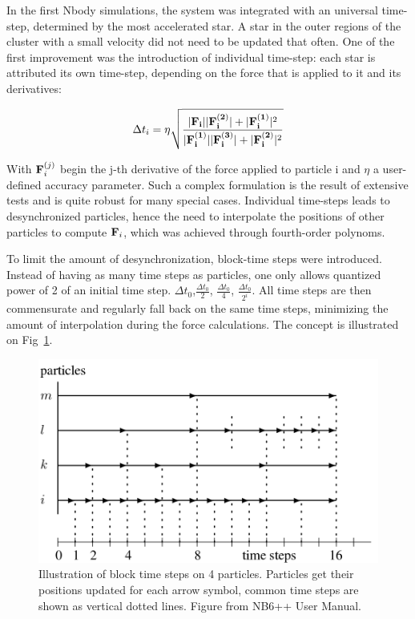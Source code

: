 In the first Nbody simulations, the system was integrated with an universal time-step, determined by the most accelerated star. A star in the outer regions of the cluster with a small velocity did not need to be updated that often. One of the first improvement  was the introduction of individual time-step: each star is attributed its own time-step, depending on the force that is applied to it and its derivatives:

\begin{equation}
\label{Eq:0_timestep}
\Delta t_i =  \eta \sqrt{\frac{ |\bold{F_i}||\bold{F^{(2)}_i}| + |\bold{F^{(1)}_i}|^2 }{|\bold{F^{(1)}_i}||\bold{F^{(3)}_i}| + |\bold{F^{(2)}_i}|^2}}
\end{equation}
 
With $\bold{F}^{(j)}_i$ begin the j-th derivative of the force applied to particle i and $\eta$ a user-defined accuracy parameter. Such a complex formulation is the result of extensive tests and is quite robust for many special cases. Individual time-steps leads to desynchronized particles, hence the need to interpolate the positions of other particles to compute $\bold{F}_i$, which was achieved through fourth-order polynoms.
 
 To limit the amount of desynchronization, block-time steps were introduced. Instead of having as many time steps as particles, one only allows quantized power of 2 of an initial time step. $\Delta t_0$,$\frac{\Delta t_0}{2}$, $\frac{\Delta t_0}{4}$, $\frac{\Delta t_0}{2^i}$. All time steps are then commensurate and regularly fall back on the same time steps, minimizing the amount of interpolation during the force calculations. The concept is illustrated on Fig~\ref{Fig:0_blocktimesteps}.
 
\begin{figure}

\center
\includegraphics[width=0.6\linewidth]{Figures/0_block_timesteps.png}
\caption{Illustration of block time steps on 4 particles. Particles get their positions updated for each arrow symbol, common time steps are shown as vertical dotted lines. Figure from NB6++ User Manual. }
\label{Fig:0_blocktimesteps}
\end{figure} 
 

